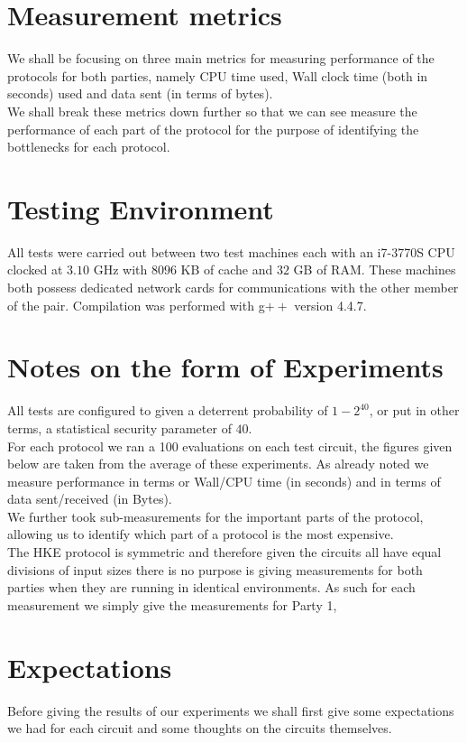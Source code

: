 \documentclass[ %
                    author={Nicholas Tutte},
                supervisor={Prof. Nigel Smart},
                    degree={MEng},
                     title={Secure Two Party Computation},
                  subtitle={A practical comparison of recent protocols},
                      type={Research - GG1K},
                      year={2015} ]{dissertation}
\begin{document}
		\section{Measurement metrics}
			We shall be focusing on three main metrics for measuring performance of the protocols for both parties, namely CPU time used, Wall clock time (both in seconds) used and data sent (in terms of bytes).\\

			We shall break these metrics down further so that we can see measure the performance of each part of the protocol for the purpose of identifying the bottlenecks for each protocol.

		\section{Testing Environment}
			All tests were carried out between two test machines each with an i7-3770S CPU clocked at $3.10$ GHz with $8096$ KB of cache and $32$ GB of RAM. These machines both possess dedicated network cards for communications with the other member of the pair. Compilation was performed with g$++$ version 4.4.7. 


		\section{Notes on the form of Experiments}
			All tests are configured to given a deterrent probability of $1 - 2^{40}$, or put in other terms, a statistical security parameter of $40$.\\

			For each protocol we ran a 100 evaluations on each test circuit, the figures given below are taken from the average of these experiments. As already noted we measure performance in terms or Wall/CPU time (in seconds) and in terms of data sent/received (in Bytes).\\

			We further took sub-measurements for the important parts of the protocol, allowing us to identify which part of a protocol is the most expensive.\\

			The HKE protocol is symmetric and therefore given the circuits all have equal divisions of input sizes there is no purpose is giving measurements for both parties when they are running in identical environments. As such for each measurement we simply give the measurements for Party 1, 


		\section{Expectations}
			Before giving the results of our experiments we shall first give some expectations we had for each circuit and some thoughts on the circuits themselves.
\end{document}
